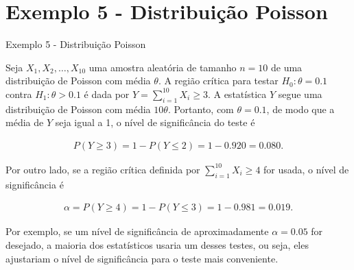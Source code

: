 \documentclass[12pt]{beamer}
\begin{document}
\section{Exemplo 5 - Distribuição Poisson}
\begin{frame}{Exemplo 5 - Distribuição Poisson}
\begin{block}{}
\justifying
Seja $X_1, X_2, \ldots, X_{10}$ uma amostra aleatória de tamanho $n = 10$ de uma distribuição de Poisson com média $\theta$. A região crítica para testar $H_0 : \theta = 0.1$ contra $H_1 : \theta > 0.1$ é dada por $Y = {\displaystyle \sum_{i=1}^{10}} X_i \geq 3$. A estatística $Y$ segue uma distribuição de Poisson com média $10\theta$. Portanto, com $\theta = 0.1$, de modo que a média de $Y$ seja igual a 1, o nível de significância do teste é

\begin{align*}
P(Y \geq 3) = 1 - P(Y \leq 2) = 1 - 0.920 = 0.080.
\end{align*}
\end{block}
\end{frame}

\begin{frame}{}
\begin{block}{}
\justifying
Por outro lado, se a região crítica definida por $\sum_{i=1}^{10} X_i \geq 4$ for usada, o nível de significância é

\begin{align*}
\alpha = P(Y \geq 4) = 1 - P(Y \leq 3) = 1 - 0.981 = 0.019.
\end{align*}

Por exemplo, se um nível de significância de aproximadamente $\alpha = 0.05$ for desejado, a maioria dos estatísticos usaria um desses testes, ou seja, eles ajustariam o nível de significância para o teste mais conveniente. 
\end{block}
\end{frame}
\end{document}
